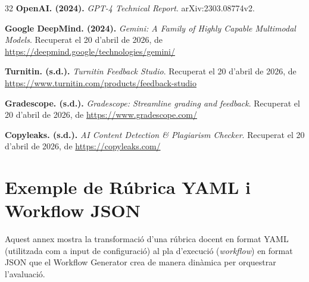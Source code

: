 \documentclass[12pt,a4paper,twoside]{report}
\begin{document}
\begin{thebibliography}{32}
     \textbf{OpenAI. (2024).} \textit{GPT-4 Technical Report}. arXiv:2303.08774v2.

     \textbf{Google DeepMind. (2024).} \textit{Gemini: A Family of Highly Capable Multimodal Models}. Recuperat el 20 d'abril de 2026, de \url{https://deepmind.google/technologies/gemini/}

     \textbf{Turnitin. (s.d.).} \textit{Turnitin Feedback Studio}. Recuperat el 20 d'abril de 2026, de \url{https://www.turnitin.com/products/feedback-studio}

     \textbf{Gradescope. (s.d.).} \textit{Gradescope: Streamline grading and feedback}. Recuperat el 20 d'abril de 2026, de \url{https://www.gradescope.com/}

     \textbf{Copyleaks. (s.d.).} \textit{AI Content Detection \& Plagiarism Checker}. Recuperat el 20 d'abril de 2026, de \url{https://copyleaks.com/}

\end{thebibliography}


\appendix

\chapter{Exemple de R\'ubrica YAML i Workflow JSON}
\label{annex:rubrica-workflow}
Aquest annex mostra la transformaci\'o d'una r\'ubrica docent en format YAML (utilitzada com a input de configuraci\'o) al pla d'execuci\'o (\textit{workflow}) en format JSON que el Workflow Generator crea de manera din\`amica per orquestrar l'avaluaci\'o.
\end{document}
